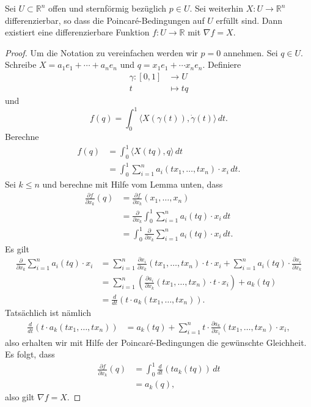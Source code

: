 \documentclass[../main.tex]{subfiles}
\begin{document}
\begin{theorem}
  Sei $U \subset \mathbb{R}^n$ offen und sternförmig bezüglich
  $p \in U$. Sei weiterhin $X \colon U \to \mathbb{R}^n$ 
  differenzierbar, so dass die Poincaré-Bedingungen
  auf $U$ erfüllt sind.
  Dann existiert eine differenzierbare Funktion
  $f \colon U \to \mathbb{R}$ mit $\nabla f = X$.
\end{theorem}

\begin{proof}
  Um die Notation zu vereinfachen werden wir $p = 0$ annehmen.
  Sei $q \in U$.
  Schreibe $X = a_1 e_1 + \cdots + a_n e_n$ und
  $q = x_1 e_1 + \cdots x_n e_n$.
  Definiere
  \begin{align*}
    \gamma \colon [0, 1] & \to U \\
    t & \mapsto tq
  \end{align*}
  und
  \[
    f(q) = \int_{0}^{1} \langle X(\gamma(t)),
    \dot \gamma (t) \rangle \, dt.
  \]
  Berechne
  \begin{align*}
    f(q)
    & = \int_{0}^{1} \langle X(tq), q \rangle \, dt\\
    &= \int_{0}^{1} \sum_{i=1}^{n} a_i(tx_1, \dots, tx_n) \cdot x_i \, dt.
  \end{align*}
  Sei $k \leq n$ und berechne mit Hilfe vom Lemma unten, dass
  \begin{align*}
    \frac{\partial f}{\partial x_k}(q)
    & = \frac{\partial f}{\partial x_k } (x_1, \dots, x_n)\\
    &= \frac{\partial}{\partial x_k} \int_{0}^{1} 
    \sum_{i=1}^{n} a_i (tq) \cdot x_i \, dt \\
    &= \int_{0}^{1} \frac{\partial}{\partial x_k}
    \sum_{i=1}^{n} a_i(tq) \cdot x_i \, dt.
  \end{align*}
  Es gilt
  \begin{align*}
    \frac{\partial}{\partial x_k}
    \sum_{i=1}^{n} a_i(tq) \cdot x_i
    &= \sum_{i=1}^{n} \frac{\partial x_i}{\partial x_k}
    (tx_1, \dots, tx_n) \cdot t \cdot x_i
    + \sum_{i=1}^{n} a_i(tq) \cdot \frac{\partial x_i}{\partial x_k}\\
    &= \sum_{i=1}^{n} \left( \frac{\partial a_i}{\partial x_k}
    (tx_1, \dots, tx_n) \cdot t \cdot x_i \right)
    + a_k(tq) \\
    &= \frac{d}{dt} (t \cdot a_k(tx_1, \dots, tx_n)).
  \end{align*}
  Tatsächlich ist nämlich
  \begin{align*}
    \frac{d}{dt}(t \cdot a_k(tx_1, \dots, tx_n))
    & = a_k(tq) + \sum_{i=1}^{n} t \cdot \frac{\partial a_k}{\partial x_i}
    (tx_1, \dots, tx_n) \cdot x_i,
  \end{align*}
  also erhalten wir mit Hilfe der Poincaré-Bedingungen
  die gewünschte Gleichheit.
  Es folgt, dass
  \begin{align*}
    \frac{\partial f}{\partial x_k}(q)
    & = \int_{0}^{1} \frac{d}{dt}(t a_k (tq)) \, dt\\
    &= a_k(q),
  \end{align*}
  also gilt $\nabla f = X$.
\end{proof}
\end{document}
